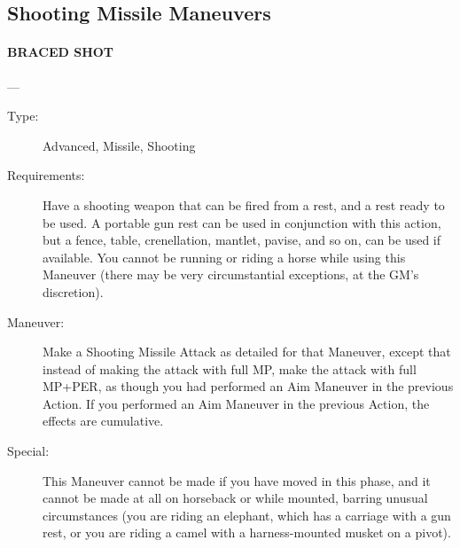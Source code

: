 \documentclass[oneside,11pt,english]{book}
\begin{document}
\subsection{Shooting Missile Maneuvers}
\paragraph{\large\label{man:BRACED SHOT} BRACED SHOT}---\quad{\large[???????]}
\vspace{-10pt}\begin{description} 
\item [Type:] Advanced, Missile, Shooting 
\item [Requirements:] Have a shooting weapon that can be fired from a rest, and a rest ready to be used. A 
portable gun rest can be used in conjunction with this action, but a fence, table, crenellation, mantlet, 
pavise, and so on, can be used if available. You cannot be running or riding a horse while using this 
Maneuver (there may be very circumstantial exceptions, at the GM’s discretion). 
\item [Maneuver:] Make a Shooting Missile Attack as detailed for that Maneuver, except that instead of making 
the attack with full MP, make the attack with full MP+PER, as though you had performed an Aim 
Maneuver in the previous Action. If you performed an Aim Maneuver in the previous Action, the effects 
are cumulative. 
\item [Special:] This Maneuver cannot be made if you have moved in this phase, and it cannot be made at all on 
horseback or while mounted, barring unusual circumstances (you are riding an elephant, which has a 
carriage with a gun rest, or you are riding a camel with a harness-mounted musket on a pivot). 
\end{description}
\end{document}
